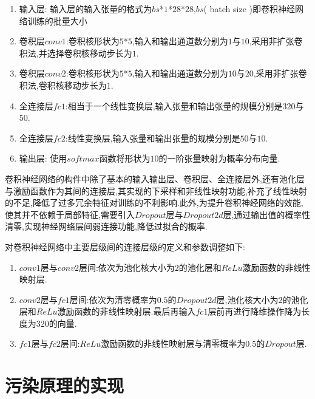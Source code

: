 \begin{enumerate}
	\item 输入层: 输入层的输入张量的格式为$bs$*$1$*$28$*$28$,$bs$( batch size )即卷积神经网络训练的批量大小
	\item 卷积层$conv1$:卷积核形状为$5$*$5$,输入和输出通道数分别为$1$与$10$,采用非扩张卷积法,并选择卷积核移动步长为$1$.
	\item 卷积层$conv2$:卷积核形状为$5$*$5$,输入和输出通道数分别为$10$与$20$,采用非扩张卷积法,卷积核移动步长为$1$.
	\item 全连接层$fc1$:相当于一个线性变换层,输入张量和输出张量的规模分别是$320$与$50$.
	\item 全连接层$fc2$:线性变换层,输入张量和输出张量的规模分别是$50$与$10$.
	\item 输出层: 使用$softmax$函数将形状为$10$的一阶张量映射为概率分布向量.
\end{enumerate}

卷积神经网络的构件中除了基本的输入输出层、卷积层、全连接层外,还有池化层与激励函数作为其间的连接层,其实现的下采样和非线性映射功能,补充了线性映射的不足,降低了过多冗余特征对训练的不利影响.此外,为提升卷积神经网络的效能,使其并不依赖于局部特征,需要引入$Dropout$层与$Dropout2d$层,通过输出值的概率性清零,实现神经网络层间弱连接功能,降低过拟合的概率.

对卷积神经网络中主要层级间的连接层级的定义和参数调整如下:

\begin{enumerate}
	\item $conv1$层与$conv2$层间:依次为池化核大小为$2$的池化层和$ReLu$激励函数的非线性映射层.
	\item $conv2$层与$fc1$层间:依次为清零概率为$0.5$的$Dropout2d$层,池化核大小为$2$的池化层和$ReLu$激励函数的非线性映射层.最后再输入$fc1$层前再进行降维操作降为长度为$320$的向量.
	\item $fc1$层与$fc2$层间:$ReLu$激励函数的非线性映射层与清零概率为$0.5$的$Dropout$层.
\end{enumerate}

\section{污染原理的实现}


